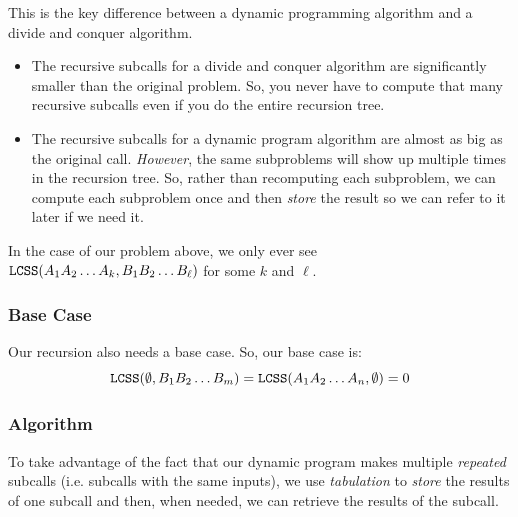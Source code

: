 \documentclass[letterpaper]{article}
\begin{document}
\begin{note}{}{}
    This is the key difference between a dynamic programming algorithm and a divide and conquer algorithm. 
    \begin{itemize}
        \item The recursive subcalls for a divide and conquer algorithm are significantly smaller than the original problem. So, you never have to compute that many recursive subcalls even if you do the entire recursion tree.
        \item The recursive subcalls for a dynamic program algorithm are almost as big as the original call. \emph{However}, the same subproblems will show up multiple times in the recursion tree. So, rather than recomputing each subproblem, we can compute each subproblem once and then \emph{store} the result so we can refer to it later if we need it. 
    \end{itemize}
    In the case of our problem above, we only ever see $\texttt{LCSS}(A_1 A_2 \dots A_k, B_1 B_2 \dots B_{\ell})$ for some $k$ and $\ell$. 
\end{note}

\subsubsection{Base Case}
Our recursion also needs a base case. So, our base case is: 
\[\texttt{LCSS}(\emptyset, B_1 B_2 \dots B_m) = \texttt{LCSS}(A_1 A_2 \dots A_n, \emptyset) = 0\]

\subsubsection{Algorithm}
To take advantage of the fact that our dynamic program makes multiple \emph{repeated} subcalls (i.e. subcalls with the same inputs), we use \emph{tabulation} to \emph{store} the results of one subcall and then, when needed, we can retrieve the results of the subcall. 

\bigskip 
\end{document}
